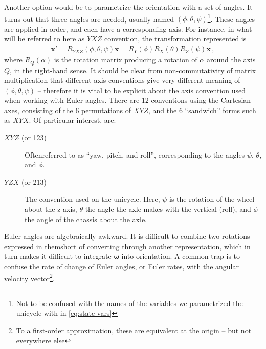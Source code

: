 \documentclass[main.tex]{subfiles}
\begin{document}
	Another option would be to parametrize the orientation with a set of angles.
	It turns out that three angles are needed, usually named $(\phi, \theta, \psi)$\footnote{Not to be confused with the names of the variables we parametrized the unicycle with in \cref{eq:state-vars}}.
	These angles are applied in order, and each have a corresponding axis. For instance, in what will be referred to here as $YXZ$ convention\footnotemark, the transformation represented is
	\begin{align}
		\bm{x}' = R_{YXZ}(\phi, \theta, \psi)\bm{x} = R_Y(\phi)R_X(\theta)R_Z(\psi) \bm{x}\,,
		\label{eq:euler-matrix}
	\end{align}
	where $R_Q(\alpha)$ is the rotation matrix producing a rotation of $\alpha$ around the axis $Q$, in the right-hand sense.
	It should be clear from non-commutativity of matrix multiplication that different axis conventions give very different meaning of $(\phi, \theta, \psi)$ -- therefore it is vital to be explicit about the axis convention used when working with Euler angles.
	There are 12 conventions using the Cartesian axes, consisting of the 6 permutations of $XYZ$, and the 6 \enquote{sandwich} forms such as $XYX$. Of particular interest, are:
	\begin{description}
		\item[$XYZ$ (or 123)]
			Often\footnotemark referred to as \enquote{yaw, pitch, and roll}, corresponding to the angles $\psi$, $\theta$, and $\phi$.
		\item[$YZX$ (or 213)]
			The convention used on the unicycle. Here, $\psi$ is the rotation of the wheel about the z axis, $\theta$ the angle the axle makes with the vertical (roll), and $\phi$ the angle of the chassis about the axle.
	\end{description}
	Euler angles are algebraically awkward. It is difficult to combine two rotations expressed in them\footnotemark short of converting through another representation, which in turn makes it difficult to integrate $\bm{\omega}$ into orientation.
	A common trap is to confuse the rate of change of Euler angles, or Euler rates, with the angular velocity vector\footnote{To a first-order approximation, these are equivalent at the origin -- but not everywhere else}.
\end{document}
